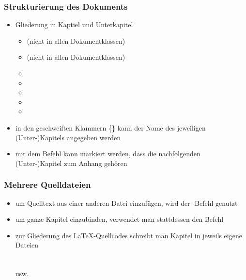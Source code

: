 \begin{frame}
	\frametitle{Strukturierung des Dokuments}
	
	\begin{itemize}
		\item Gliederung in Kaptiel und Unterkapitel
		\begin{itemize}
			\item {} (nicht in allen Dokumentklassen)
			\item {} (nicht in allen Dokumentklassen)
			\item {}
			\item {}
			\item {}
			\item {}
			\item {}
		\end{itemize}
		\item in den geschweiften Klammern \{\} kann der Name des jeweiligen (Unter-)Kapitels angegeben werden
		\item mit dem Befehl  kann markiert werden, dass die nachfolgenden (Unter-)Kapitel zum Anhang gehören
	\end{itemize}
\end{frame}

\begin{frame}[fragile]
	\frametitle{Mehrere Quelldateien}
	\begin{itemize}
		\item um Quelltext aus einer anderen Datei einzufügen, wird der -Befehl genutzt\\
		\lstinline$$
		\item um ganze Kapitel einzubinden, verwendet man stattdessen den Befehl\\
		\lstinline$$
		\item zur Gliederung des \LaTeX-Quellcodes schreibt man Kapitel in jeweils eigene Dateien\\
		\lstinline$$\\
		\lstinline$$\\
		usw.
	\end{itemize}
\end{frame}
